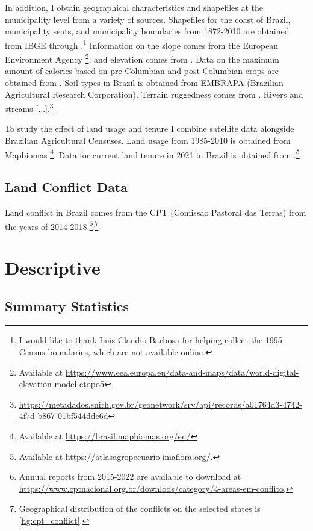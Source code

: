 \documentclass{article}
\begin{document}
In addition, I obtain geographical characteristics and shapefiles at the municipality level from a variety of sources. 
Shapefiles for the coast of Brazil, municipality seats, and municipality boundaries from 1872-2010 are obtained from IBGE through \textcite{Pereira2023-qq}.\footnote{I would like to thank Luis Claudio Barbosa for helping collect the 1995 Census boundaries, which are not available online.}
Information on the slope comes from the European Environment Agency
\footnote{
  Available at \url{https://www.eea.europa.eu/data-and-maps/data/world-digital-elevation-model-etopo5}}, and elevation comes from \textcite{Amatulli2018-gl}.
Data on the maximum amount of calories based on pre-Columbian and post-Columbian crops are obtained from \textcite{Galor2016-ba}. 
Soil types in Brazil is obtained from EMBRAPA (Brazilian Agricultural Research Corporation).
Terrain ruggedness comes from \textcite{Nunn2012-hb}.
Rivers and streams [...].\footnote{\url{https://metadados.snirh.gov.br/geonetwork/srv/api/records/a01764d3-4742-4f7d-b867-01bf544dde6d}}

To study the effect of land usage and tenure I combine satellite data alongside Brazilian Agricultural Censuses. 
Land usage from 1985-2010 is obtained from Mapbiomas \parencite{Souza2020-kb}\footnote{
  Available at \url{https://brasil.mapbiomas.org/en/}}.
Data for current land tenure in 2021 in Brazil is obtained from \textcite{Sparovek2019-dn}.\footnote{
  Available at \url{https://atlasagropecuario.imaflora.org/}.}

\subsection{Land Conflict Data}

Land conflict in Brazil comes from the CPT (Comissao Pastoral das Terras) from the years of 2014-2018.\footnote{Annual reports from 2015-2022 are available to download at \url{https://www.cptnacional.org.br/downlods/category/4-areas-em-conflito}.}\textsuperscript{,}\footnote{Geographical distribution of the conflicts on the selected states is \autoref{fig:cpt_conflict}.}



\parencite{Klein_Goldewijk2017-mr}

\section{Descriptive}

\subsection{Summary Statistics}
\end{document}
